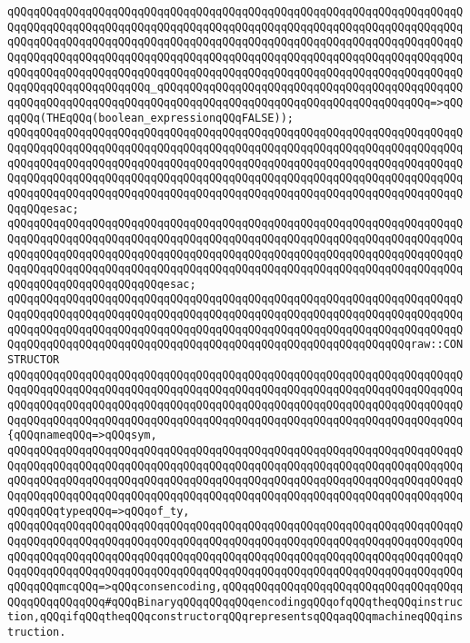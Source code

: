 \verb|qQQqqQQqqQQqqQQqqQQqqQQqqQQqqQQqqQQqqQQqqQQqqQQqqQQqqQQqqQQqqQQqqQQqqQQqqQQqqQQqqQQqqQQqqQQqqQQqqQQqqQQqqQQqqQQqqQQqqQQqqQQqqQQqqQQqqQQqqQQqqQQqqQQqqQQqqQQqqQQqqQQqqQQqqQQqqQQqqQQqqQQqqQQqqQQqqQQqqQQqqQQqqQQqqQQqqQQqqQQqqQQqqQQqqQQqqQQqqQQqqQQqqQQqqQQqqQQqqQQqqQQqqQQqqQQqqQQqqQQqqQQqqQQqqQQqqQQqqQQqqQQqqQQqqQQqqQQqqQQqqQQqqQQqqQQqqQQqqQQqqQQqqQQqqQQqqQQqqQQqqQQqqQQqqQQq_qQQqqQQqqQQqqQQqqQQqqQQqqQQqqQQqqQQqqQQqqQQqqQQqqQQqqQQqqQQqqQQqqQQqqQQqqQQqqQQqqQQqqQQqqQQqqQQqqQQqqQQqqQQqqQQq=>qQQqqQQq(THEqQQq(boolean_expressionqQQqFALSE));|\newline
\verb|qQQqqQQqqQQqqQQqqQQqqQQqqQQqqQQqqQQqqQQqqQQqqQQqqQQqqQQqqQQqqQQqqQQqqQQqqQQqqQQqqQQqqQQqqQQqqQQqqQQqqQQqqQQqqQQqqQQqqQQqqQQqqQQqqQQqqQQqqQQqqQQqqQQqqQQqqQQqqQQqqQQqqQQqqQQqqQQqqQQqqQQqqQQqqQQqqQQqqQQqqQQqqQQqqQQqqQQqqQQqqQQqqQQqqQQqqQQqqQQqqQQqqQQqqQQqqQQqqQQqqQQqqQQqqQQqqQQqqQQqqQQqqQQqqQQqqQQqqQQqqQQqqQQqqQQqqQQqqQQqqQQqqQQqqQQqqQQqqQQqqQQqqQQqqQQqqQQqesac;|\newline
\verb|qQQqqQQqqQQqqQQqqQQqqQQqqQQqqQQqqQQqqQQqqQQqqQQqqQQqqQQqqQQqqQQqqQQqqQQqqQQqqQQqqQQqqQQqqQQqqQQqqQQqqQQqqQQqqQQqqQQqqQQqqQQqqQQqqQQqqQQqqQQqqQQqqQQqqQQqqQQqqQQqqQQqqQQqqQQqqQQqqQQqqQQqqQQqqQQqqQQqqQQqqQQqqQQqqQQqqQQqqQQqqQQqqQQqqQQqqQQqqQQqqQQqqQQqqQQqqQQqqQQqqQQqqQQqqQQqqQQqqQQqqQQqqQQqqQQqqQQqqQQqqQQqesac;|\newline
\newline
\verb|qQQqqQQqqQQqqQQqqQQqqQQqqQQqqQQqqQQqqQQqqQQqqQQqqQQqqQQqqQQqqQQqqQQqqQQqqQQqqQQqqQQqqQQqqQQqqQQqqQQqqQQqqQQqqQQqqQQqqQQqqQQqqQQqqQQqqQQqqQQqqQQqqQQqqQQqqQQqqQQqqQQqqQQqqQQqqQQqqQQqqQQqqQQqqQQqqQQqqQQqqQQqqQQqqQQqqQQqqQQqqQQqqQQqqQQqqQQqqQQqqQQqqQQqqQQqqQQqqQQqqQQqqQQqqQQqraw::CONSTRUCTOR|\newline
\verb|qQQqqQQqqQQqqQQqqQQqqQQqqQQqqQQqqQQqqQQqqQQqqQQqqQQqqQQqqQQqqQQqqQQqqQQqqQQqqQQqqQQqqQQqqQQqqQQqqQQqqQQqqQQqqQQqqQQqqQQqqQQqqQQqqQQqqQQqqQQqqQQqqQQqqQQqqQQqqQQqqQQqqQQqqQQqqQQqqQQqqQQqqQQqqQQqqQQqqQQqqQQqqQQqqQQqqQQqqQQqqQQqqQQqqQQqqQQqqQQqqQQqqQQqqQQqqQQqqQQqqQQqqQQqqQQqqQQqqQQq{qQQqnameqQQq=>qQQqsym,|\newline
\verb|qQQqqQQqqQQqqQQqqQQqqQQqqQQqqQQqqQQqqQQqqQQqqQQqqQQqqQQqqQQqqQQqqQQqqQQqqQQqqQQqqQQqqQQqqQQqqQQqqQQqqQQqqQQqqQQqqQQqqQQqqQQqqQQqqQQqqQQqqQQqqQQqqQQqqQQqqQQqqQQqqQQqqQQqqQQqqQQqqQQqqQQqqQQqqQQqqQQqqQQqqQQqqQQqqQQqqQQqqQQqqQQqqQQqqQQqqQQqqQQqqQQqqQQqqQQqqQQqqQQqqQQqqQQqqQQqqQQqqQQqqQQqqQQqtypeqQQq=>qQQqof_ty,|\newline
\verb|qQQqqQQqqQQqqQQqqQQqqQQqqQQqqQQqqQQqqQQqqQQqqQQqqQQqqQQqqQQqqQQqqQQqqQQqqQQqqQQqqQQqqQQqqQQqqQQqqQQqqQQqqQQqqQQqqQQqqQQqqQQqqQQqqQQqqQQqqQQqqQQqqQQqqQQqqQQqqQQqqQQqqQQqqQQqqQQqqQQqqQQqqQQqqQQqqQQqqQQqqQQqqQQqqQQqqQQqqQQqqQQqqQQqqQQqqQQqqQQqqQQqqQQqqQQqqQQqqQQqqQQqqQQqqQQqqQQqqQQqqQQqqQQqmcqQQq=>qQQqconsencoding,qQQqqQQqqQQqqQQqqQQqqQQqqQQqqQQqqQQqqQQqqQQqqQQqqQQq#qQQqBinaryqQQqqQQqqQQqencodingqQQqofqQQqtheqQQqinstruction,qQQqifqQQqtheqQQqconstructorqQQqrepresentsqQQqaqQQqmachineqQQqinstruction.|\newline
